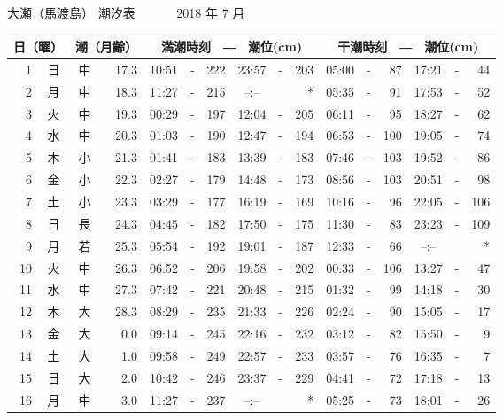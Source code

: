 \documentclass[12pt.a4j]{jsarticle}
\begin{document}
\begin{center}
\begin{table}[ht]
\begin{tabular}{|rc|cr|ccrccr|ccrccr|}
\hline
\end{tabular}
\end{table}
\newpage
{\LARGE 大瀬（馬渡島）  潮汐表　　　}
{\large 2018 年  7 月}\\
\begin{table}[ht]
\begin{tabular}{|rc|cr|ccrccr|ccrccr|}
\hline
\multicolumn{2}{|c|}{日（曜）} & \multicolumn{2}{c|}{潮（月齢）} & \multicolumn{6}{c|}{満潮時刻　―　潮位(cm)} & \multicolumn{6}{c|}{干潮時刻　―　潮位(cm)} \\
\hline
 1 & 日 & 中 & 17.3 & 10:51 &-& 222 & 23:57 &-& 203 & 05:00 &-&  87 & 17:21 &-&  44 \\
 2 & 月 & 中 & 18.3 & 11:27 &-& 215 & --:-- & &  *  & 05:35 &-&  91 & 17:53 &-&  52 \\
 3 & 火 & 中 & 19.3 & 00:29 &-& 197 & 12:04 &-& 205 & 06:11 &-&  95 & 18:27 &-&  62 \\
 4 & 水 & 中 & 20.3 & 01:03 &-& 190 & 12:47 &-& 194 & 06:53 &-& 100 & 19:05 &-&  74 \\
 5 & 木 & 小 & 21.3 & 01:41 &-& 183 & 13:39 &-& 183 & 07:46 &-& 103 & 19:52 &-&  86 \\
 6 & 金 & 小 & 22.3 & 02:27 &-& 179 & 14:48 &-& 173 & 08:56 &-& 103 & 20:51 &-&  98 \\
 7 & 土 & 小 & 23.3 & 03:29 &-& 177 & 16:19 &-& 169 & 10:16 &-&  96 & 22:05 &-& 106 \\
 8 & 日 & 長 & 24.3 & 04:45 &-& 182 & 17:50 &-& 175 & 11:30 &-&  83 & 23:23 &-& 109 \\
 9 & 月 & 若 & 25.3 & 05:54 &-& 192 & 19:01 &-& 187 & 12:33 &-&  66 & --:-- & &  *  \\
10 & 火 & 中 & 26.3 & 06:52 &-& 206 & 19:58 &-& 202 & 00:33 &-& 106 & 13:27 &-&  47 \\
11 & 水 & 中 & 27.3 & 07:42 &-& 221 & 20:48 &-& 215 & 01:32 &-&  99 & 14:18 &-&  30 \\
12 & 木 & 大 & 28.3 & 08:29 &-& 235 & 21:33 &-& 226 & 02:24 &-&  90 & 15:05 &-&  17 \\
13 & 金 & 大 &  0.0 & 09:14 &-& 245 & 22:16 &-& 232 & 03:12 &-&  82 & 15:50 &-&   9 \\
14 & 土 & 大 &  1.0 & 09:58 &-& 249 & 22:57 &-& 233 & 03:57 &-&  76 & 16:35 &-&   7 \\
15 & 日 & 大 &  2.0 & 10:42 &-& 246 & 23:37 &-& 229 & 04:41 &-&  72 & 17:18 &-&  13 \\
16 & 月 & 中 &  3.0 & 11:27 &-& 237 & --:-- & &  *  & 05:25 &-&  73 & 18:01 &-&  26 \\

\end{tabular}
\end{table}
\end{center}
\end{document}
